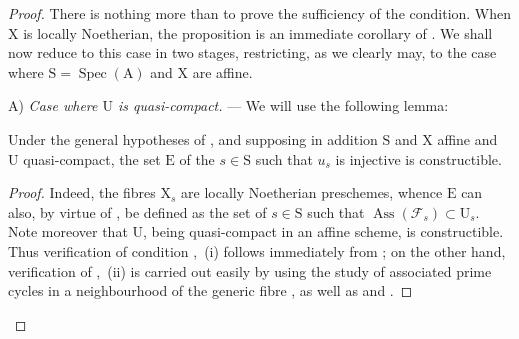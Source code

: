\begin{proof}
There is nothing more than to prove the sufficiency of the condition.
When $\mathrm{X}$ is locally Noetherian, the proposition is an immediate corollary of .
We shall now reduce to this case in two stages, restricting, as we clearly may, to the case where $\mathrm{S}=\operatorname{Spec}(\mathrm{A})$ and $\mathrm{X}$ are affine.
\medskip

A) \emph{Case where $\mathrm{U}$ is quasi-compact.} --- We will use the following lemma:

\begin{lemma}[11.9.17.1]
\label{IV.11.9.17.1}
Under the general hypotheses of , and supposing in addition $\mathrm{S}$ and $\mathrm{X}$ affine and $\mathrm{U}$ quasi-compact, the set $\mathrm{E}$ of the $s\in\mathrm{S}$ such that $u_s$ is injective is constructible.
\end{lemma}

\begin{proof}
Indeed, the fibres $\mathrm{X}_s$ are locally Noetherian preschemes, whence $\mathrm{E}$ can also, by virtue of , be defined as the set of $s\in\mathrm{S}$ such that $\operatorname{Ass}(\mathscr{F}_s)\subset\mathrm{U}_s$.
Note moreover that $\mathrm{U}$, being quasi-compact in an affine scheme, is constructible. Thus verification of condition ,~(i) follows immediately from ; on the other hand,
verification of ,~(ii) is carried out easily by using the study of associated prime cycles in a neighbourhood of the generic fibre , as well as  and .
\end{proof}


\end{proof}
